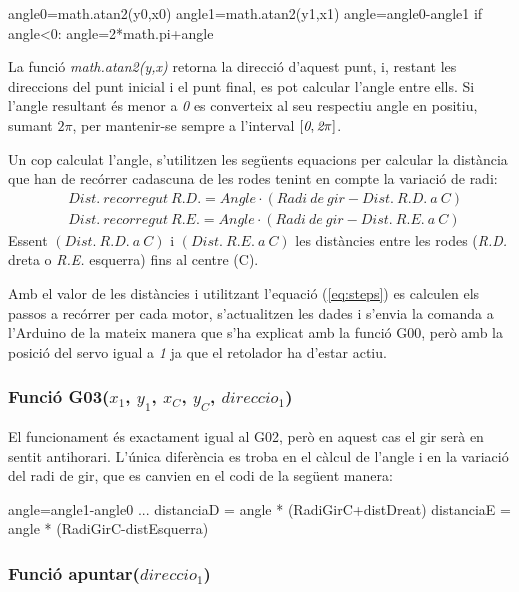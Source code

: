 \begin{python}
	angle0=math.atan2(y0,x0)
	angle1=math.atan2(y1,x1)
	angle=angle0-angle1
	if angle<0:
		angle=2*math.pi+angle
\end{python}

La funció \emph{math.atan2(y,x)} retorna la direcció d’aquest punt, i, restant les direccions del punt inicial i el punt final, es pot calcular l'angle entre ells. Si l’angle resultant és menor a \emph{0} es converteix al seu respectiu angle en positiu, sumant $2\pi$, per mantenir-se sempre a l’interval $[\emph{0},\emph{2} \pi]$.

Un cop calculat l’angle, s’utilitzen les següents equacions per calcular la distància que han de recórrer cadascuna de les rodes tenint en compte la variació de radi:
\begin{eqnarray}
\nonumber &Dist. \ recorregut \ R.D. = Angle \cdot (Radi \ de \ gir-Dist. \ R.D. \ a \ C) \\ 
&Dist. \ recorregut \ R.E. = Angle \cdot (Radi \ de \ gir-Dist. \ R.E. \ a \ C)
\end{eqnarray}
Essent  $(Dist. \ R.D. \ a \ C)$ i $(Dist. \ R.E. \ a \ C)$ les distàncies entre les rodes (\emph{R.D.} dreta o \emph{R.E.} esquerra) fins al centre (C).

Amb el valor de les distàncies i utilitzant l’equació (\ref{eq:steps}) es calculen els passos a recórrer per cada motor, s’actualitzen les dades i s’envia la comanda a l’Arduino de la mateix manera que s’ha explicat amb la funció G00, però amb la posició del servo igual a \emph{1} ja que el retolador ha d’estar actiu. 

\subsubsection{Funció G03($x_{1}$, $y_{1}$, $x_{C}$, $y_{C}$, $direccio_{1}$)}
El funcionament és exactament igual al G02, però en aquest cas el gir serà en sentit antihorari. L'única diferència es troba en el càlcul de l’angle i en la variació del radi de gir, que es canvien en el codi de la següent manera: \\


\begin{python}
	angle=angle1-angle0
	...
	distanciaD = angle * (RadiGirC+distDreat) 
	distanciaE = angle * (RadiGirC-distEsquerra)
\end{python}
\subsubsection{Funció apuntar($direccio_{1}$)}\label{apuntar}

